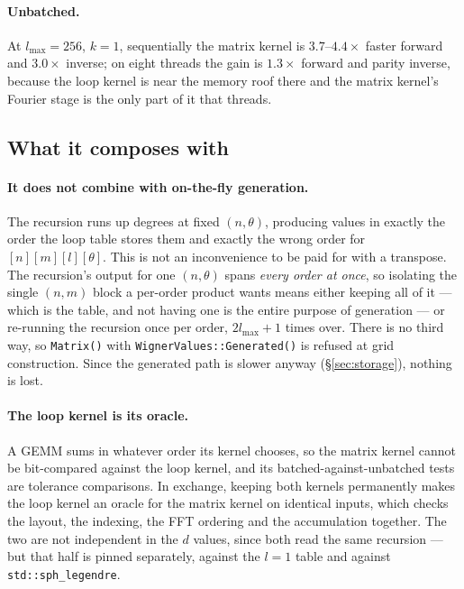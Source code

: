 \documentclass[11pt,a4paper]{article}
\newcommand{\code}[1]{\texttt{#1}}
\begin{document}
\paragraph{Unbatched.}  At $l_{\max}=256$, $k=1$, sequentially the matrix
kernel is $3.7$--$4.4\times$ faster forward and $3.0\times$ inverse; on
eight threads the gain is $1.3\times$ forward and parity inverse, because
the loop kernel is near the memory roof there and the matrix kernel's
Fourier stage is the only part of it that threads.

\subsection{What it composes with}
\label{sec:gemmcompose}

\paragraph{It does not combine with on-the-fly generation.}  The recursion
runs up degrees at fixed $(n,\theta)$, producing values in exactly the
order the loop table stores them and exactly the wrong order for
$[n][m][l][\theta]$.  This is not an inconvenience to be paid for with a
transpose.  The recursion's output for one $(n,\theta)$ spans \emph{every
order at once}, so isolating the single $(n,m)$ block a per-order product
wants means either keeping all of it --- which is the table, and not
having one is the entire purpose of generation --- or re-running the
recursion once per order, $2l_{\max}+1$ times over.  There is no third
way, so \code{Matrix()} with \code{WignerValues::Generated()} is refused
at grid construction.  Since the generated path is slower anyway
(\S\ref{sec:storage}), nothing is lost.

\paragraph{The loop kernel is its oracle.}  A GEMM sums in whatever order
its kernel chooses, so the matrix kernel cannot be bit-compared against
the loop kernel, and its batched-against-unbatched tests are tolerance
comparisons.  In exchange, keeping both kernels permanently makes the loop
kernel an oracle for the matrix kernel on identical inputs, which checks
the layout, the indexing, the FFT ordering and the accumulation together.
The two are not independent in the $d$ values, since both read the same
recursion --- but that half is pinned separately, against the $l=1$ table
and against \code{std::sph\_legendre}.
\end{document}
